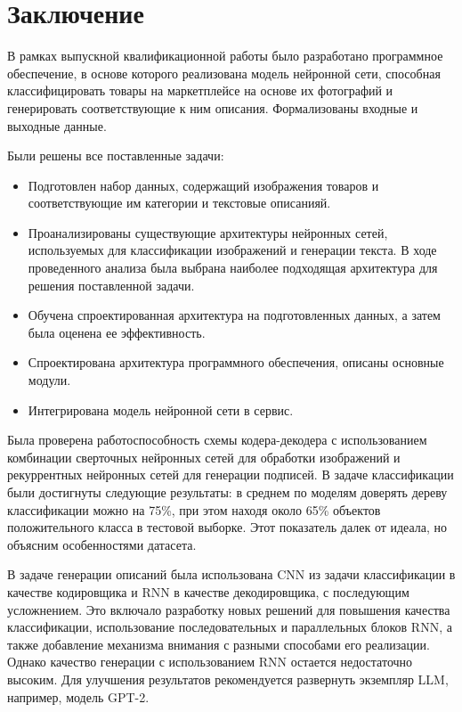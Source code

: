 \documentclass[a4paper,12pt]{extarticle}
\begin{document}
\newpage

\newpage
\section*{Заключение}

В рамках выпускной квалификационной работы было разработано программное обеспечение, в основе которого реализована модель нейронной сети, способная классифицировать товары на маркетплейсе на основе их фотографий и генерировать соответствующие к ним описания. Формализованы входные и выходные данные.

Были решены все поставленные задачи:
\begin{itemize}
	\item Подготовлен набор данных, содержащий изображения товаров и соответствующие им категории и текстовые описанияй.
	\item Проанализированы существующие архитектуры нейронных сетей, используемых для классификации изображений и генерации текста. В ходе проведенного анализа была выбрана наиболее подходящая архитектура для решения поставленной задачи.
	\item Обучена спроектированная архитектура на подготовленных данных, а затем была оценена ее эффективность.
	\item Спроектирована архитектура программного обеспечения, описаны основные модули.
	\item Интегрирована модель нейронной сети в сервис.
\end{itemize}

Была проверена работоспособность схемы кодера-декодера с использованием комбинации сверточных нейронных сетей для обработки изображений и рекуррентных нейронных сетей для генерации подписей. В задаче классификации были достигнуты следующие результаты: в среднем по моделям доверять дереву классификации можно на 75\%, при этом находя около 65\% объектов положительного класса в тестовой выборке. Этот показатель далек от идеала, но объясним особенностями датасета.

В задаче генерации описаний была использована CNN из задачи классификации в качестве кодировщика и RNN в качестве декодировщика, с последующим усложнением. Это включало разработку новых решений для повышения качества классификации, использование последовательных и параллельных блоков RNN, а также добавление механизма внимания с разными способами его реализации. Однако качество генерации с использованием RNN остается недостаточно высоким. Для улучшения результатов рекомендуется развернуть экземпляр LLM, например, модель GPT-2. 
\end{document}

